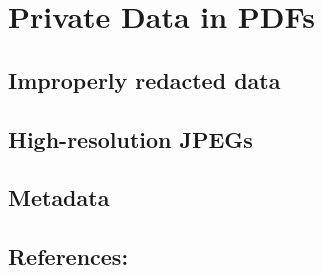 \chapter{Private Data in PDFs}
\section{Improperly redacted data}
\section{High-resolution JPEGs}
\section{Metadata}
\section{References:}



